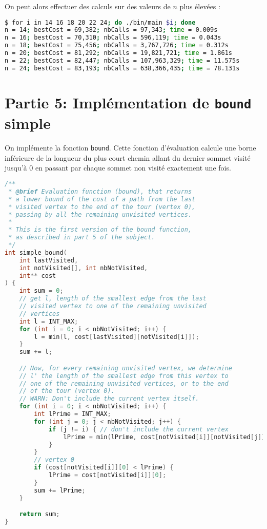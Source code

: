 On peut alors effectuer des calculs sur des valeurs de $n$ plus élevées :

\begin{lstlisting}[language=bash, caption={Exécution de l'algorithme \texttt{permut} pour différentes valeurs de $n$.}]
$ for i in 14 16 18 20 22 24; do ./bin/main $i; done
n = 14; bestCost = 69,382; nbCalls = 97,343; time = 0.009s
n = 16; bestCost = 70,310; nbCalls = 596,119; time = 0.043s
n = 18; bestCost = 75,456; nbCalls = 3,767,726; time = 0.312s
n = 20; bestCost = 81,292; nbCalls = 19,821,721; time = 1.861s
n = 22; bestCost = 82,447; nbCalls = 107,963,329; time = 11.575s
n = 24; bestCost = 83,193; nbCalls = 638,366,435; time = 78.131s
\end{lstlisting}

\section{Partie 5: Implémentation de \texttt{bound} simple}

On implémente la fonction \texttt{bound}. Cette fonction d'évaluation calcule une borne inférieure de la longueur du plus court chemin allant du dernier sommet visité jusqu'à 0 en passant par chaque sommet non visité exactement une fois.

\begin{lstlisting}[language=C, caption={Fonction d'évaluation (borne) pour calculer une borne inférieure du coût.}]
/**
 * @brief Evaluation function (bound), that returns
 * a lower bound of the cost of a path from the last
 * visited vertex to the end of the tour (vertex 0),
 * passing by all the remaining unvisited vertices.
 * 
 * This is the first version of the bound function,
 * as described in part 5 of the subject.
 */
int simple_bound(
    int lastVisited, 
    int notVisited[], int nbNotVisited,
    int** cost
) {
    int sum = 0;
    // get l, length of the smallest edge from the last 
    // visited vertex to one of the remaining unvisited 
    // vertices
    int l = INT_MAX;
    for (int i = 0; i < nbNotVisited; i++) {
        l = min(l, cost[lastVisited][notVisited[i]]);
    }
    sum += l;

    // Now, for every remaining unvisited vertex, we determine
    // l' the length of the smallest edge from this vertex to
    // one of the remaining unvisited vertices, or to the end
    // of the tour (vertex 0).
    // WARN: Don't include the current vertex itself.
    for (int i = 0; i < nbNotVisited; i++) {
        int lPrime = INT_MAX;
        for (int j = 0; j < nbNotVisited; j++) {
            if (j != i) { // don't include the current vertex
                lPrime = min(lPrime, cost[notVisited[i]][notVisited[j]]);
            }
        }
        // vertex 0
        if (cost[notVisited[i]][0] < lPrime) {
            lPrime = cost[notVisited[i]][0];
        }
        sum += lPrime;
    }

    return sum;
}
\end{lstlisting}

